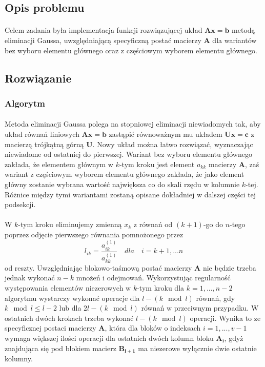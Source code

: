\documentclass[a4paper]{article}
\begin{document}
\subsection{Opis problemu}
\paragraph{}
Celem zadania była implementacja funkcji rozwiązującej układ $\mathbf{Ax = b}$ metodą eliminacji Gaussa, uwzględniającą specyficzną postać macierzy $\mathbf{A}$ dla wariantów bez wyboru elementu głównego oraz z częściowym wyborem elementu głównego.
\subsection{Rozwiązanie}
\subsubsection{Algorytm}
\paragraph{}
Metoda eliminacji Gaussa polega na stopniowej eliminacji niewiadomych tak, aby układ równań liniowych $\mathbf{Ax = b}$ zastąpić równoważnym mu układem $\mathbf{Ux = c}$ z macierzą trójkątną górną $\mathbf{U}$. Nowy układ można łatwo rozwiązać, wyznaczając niewiadome od ostatniej do pierwszej. Wariant bez wyboru elementu głównego zakłada, że elementem głównym w $k$-tym kroku jest element $a_{k k}$ macierzy $\mathbf{A}$, zaś wariant z częściowym wyborem elementu głównego zakłada, że jako element główny zostanie wybrana wartość największa co do skali rzędu w kolumnie $k$-tej. Różnice między tymi wariantami zostaną opisane dokładniej w dalszej części tej podsekcji.

\paragraph{}
W $k$-tym kroku eliminujemy zmienną $x_{k}$ z równań od $(k + 1)$-go do $n$-tego poprzez odjęcie pierwszego równania pomnożonego przez
\begin{equation}
l_{i k} = \frac{a^{(1)}_{i k}}{a^{(1)}_{k k}} \quad dla \quad i = k + 1, ... n
\end{equation}  od reszty.
Uwzględniając blokowo-taśmową postać macierzy $\mathbf{A}$ nie będzie trzeba jednak wykonać $n - k$ mnożeń i odejmowań. Wykorzystując regularność występowania elementów niezerowych w $k$-tym kroku dla $k = 1, ..., n - 2$ algorytmu wystarczy wykonać operacje dla $l -  (k \mod l)$ równań, gdy $k \mod l \leq l - 2$ lub dla $2l - (k \mod l)$ równań w przeciwnym przypadku. W ostatnich dwóch krokach trzeba wykonać $l -  (k \mod l)$ operacji. Wynika to ze specyficznej postaci macierzy $\mathbf{A}$, która dla bloków o indeksach $i = 1, ..., v - 1$ wymaga większej ilości operacji dla ostatnich dwóch kolumn bloku $\mathbf{A_{i}}$, gdyż znajdująca się pod blokiem macierz $\mathbf{B_{i + 1}}$ ma niezerowe wyłącznie dwie ostatnie kolumny.
\end{document}
